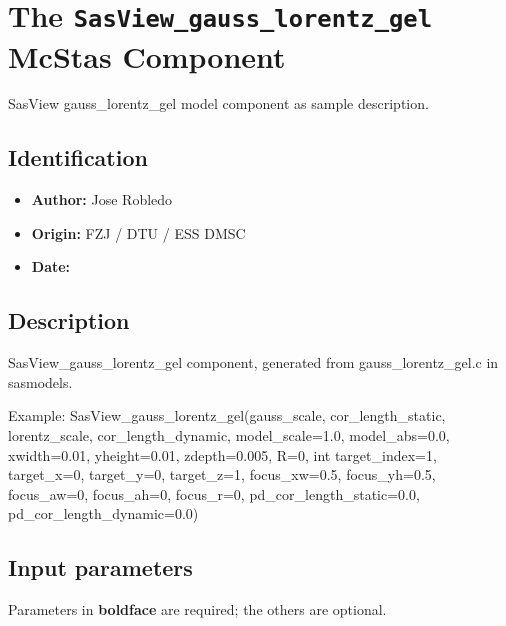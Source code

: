 \section{The \texttt{SasView\_gauss\_lorentz\_gel} McStas Component}
SasView gauss\_lorentz\_gel model component as sample description.

\subsection*{Identification}
\begin{itemize}
  \item \textbf{Author:} Jose Robledo
  \item \textbf{Origin:} FZJ / DTU / ESS DMSC
  \item \textbf{Date:} 
\end{itemize}

\subsection*{Description}
SasView\_gauss\_lorentz\_gel component, generated from gauss\_lorentz\_gel.c in sasmodels.

Example: SasView\_gauss\_lorentz\_gel(gauss\_scale, cor\_length\_static, lorentz\_scale, cor\_length\_dynamic, model\_scale=1.0, model\_abs=0.0, xwidth=0.01, yheight=0.01, zdepth=0.005, R=0, int target\_index=1, target\_x=0, target\_y=0, target\_z=1, focus\_xw=0.5, focus\_yh=0.5, focus\_aw=0, focus\_ah=0, focus\_r=0, pd\_cor\_length\_static=0.0, pd\_cor\_length\_dynamic=0.0)

\subsection*{Input parameters}
Parameters in \textbf{boldface} are required; the others are optional.

